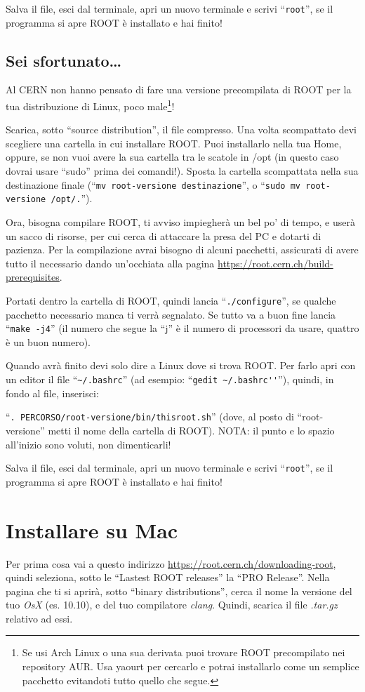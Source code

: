 Salva il file, esci dal terminale, apri un nuovo terminale e scrivi ``\verb|root|'', se il programma si apre ROOT è installato e hai finito!
\subsection{Sei sfortunato\ldots}\label{distronotfound}
Al CERN non hanno pensato di fare una versione precompilata di ROOT per la tua distribuzione di Linux, poco male\footnote{Se usi Arch Linux o una sua derivata puoi trovare ROOT precompilato nei repository AUR. Usa yaourt per cercarlo e potrai installarlo come un semplice pacchetto evitandoti tutto quello che segue.}! 

Scarica, sotto ``source distribution'', il file compresso. Una volta scompattato devi scegliere una cartella in cui installare ROOT. Puoi installarlo nella tua Home, oppure, se non vuoi avere la sua cartella tra le scatole in /opt (in questo caso dovrai usare ``sudo'' prima dei comandi!). Sposta la cartella scompattata nella sua destinazione finale (``\verb|mv root-versione destinazione|'', o ``\verb|sudo mv root-versione /opt/.|''). 

Ora, bisogna compilare ROOT, ti avviso impiegherà un bel po' di tempo, e userà un sacco di risorse, per cui cerca di attaccare la presa del PC e dotarti di pazienza. Per la compilazione avrai bisogno di alcuni pacchetti, assicurati di avere tutto il necessario dando un'occhiata alla pagina \url{https://root.cern.ch/build-prerequisites}. 

Portati dentro la cartella di ROOT, quindi lancia ``\verb|./configure|'', se qualche pacchetto necessario manca ti verrà segnalato. Se tutto va a buon fine lancia ``\verb|make -j4|'' (il numero che segue la ``j'' è il numero di processori da usare, quattro è un buon numero).

Quando avrà finito devi solo dire a Linux dove si trova ROOT. Per farlo apri con un editor il file ``\verb|~/.bashrc|'' (ad esempio: ``\verb|gedit ~/.bashrc''|''), quindi, in fondo al file, inserisci:

 ``\verb|. PERCORSO/root-versione/bin/thisroot.sh|'' (dove, al posto di ``root-versione'' metti il nome della cartella di ROOT). NOTA: il punto e lo spazio all'inizio sono voluti, non dimenticarli!

Salva il file, esci dal terminale, apri un nuovo terminale e scrivi ``\verb|root|'', se il programma si apre ROOT è installato e hai finito!
\section{Installare su Mac}\label{instmac}
Per prima cosa vai a questo indirizzo \url{https://root.cern.ch/downloading-root}, quindi seleziona, sotto le ``Lastest ROOT releases'' la ``PRO Release''. Nella pagina che ti si aprirà, sotto ``binary distributions'', cerca il nome la versione del tuo \emph{OsX} (es. 10.10), e del tuo compilatore \emph{clang}. Quindi, scarica il file \emph{.tar.gz} relativo ad essi. 

